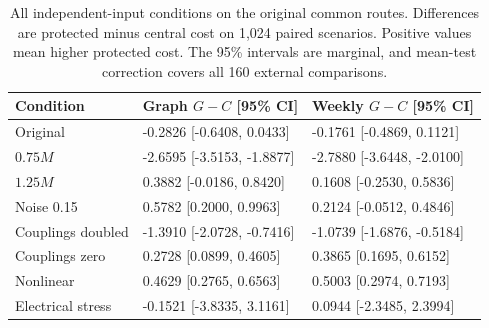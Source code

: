 \documentclass[journal]{IEEEtran}
\newcommand{\DIFnewtablecolor}{\color{blue}}
\begin{document}
\begin{table}[t]\DIFnewtablecolor
\centering
\caption{All independent-input conditions on the original common routes. Differences are protected minus central cost on 1,024 paired scenarios. Positive values mean higher protected cost. The 95\% intervals are marginal, and mean-test correction covers all 160 external comparisons.}
\label{tab:guarded-external-published}
\footnotesize\setlength{\tabcolsep}{3pt}\renewcommand{\arraystretch}{1.12}
\begin{tabular}{@{}p{}p{}p{}@{}}
\toprule
Condition & Graph $G-C$ [95\% CI] & Weekly $G-C$ [95\% CI] \\
\midrule
Original & -0.2826 [-0.6408, 0.0433] & -0.1761 [-0.4869, 0.1121] \\
$0.75M$ & -2.6595 [-3.5153, -1.8877] & -2.7880 [-3.6448, -2.0100] \\
$1.25M$ & 0.3882 [-0.0186, 0.8420] & 0.1608 [-0.2530, 0.5836] \\
Noise 0.15 & 0.5782 [0.2000, 0.9963] & 0.2124 [-0.0512, 0.4846] \\
Couplings doubled & -1.3910 [-2.0728, -0.7416] & -1.0739 [-1.6876, -0.5184] \\
Couplings zero & 0.2728 [0.0899, 0.4605] & 0.3865 [0.1695, 0.6152] \\
Nonlinear & 0.4629 [0.2765, 0.6563] & 0.5003 [0.2974, 0.7193] \\
Electrical stress & -0.1521 [-3.8335, 3.1161] & 0.0944 [-2.3485, 2.3994] \\
\bottomrule
\end{tabular}
\end{table}
\end{document}
